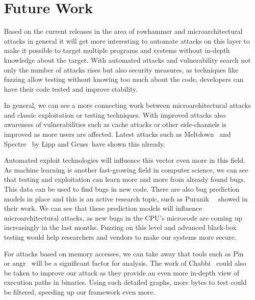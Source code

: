 \chapter{Future Work}\label{sec:futurework}

Based on the current releases in the area of rowhammer and microarchitectural
attacks in general it will get more interesting to automate attacks on this
layer to make it possible to target multiple programs and systems without
in-depth knowledge about the target. With automated attacks and vulnerability
search not only the number of attacks rises but also security measures, as
techniques like fuzzing allow testing without knowing too much about the code,
developers can have their code tested and improve stability.

In general, we can see a more connecting work between microarchitectural attacks
and classic exploitation or testing techniques. With improved attacks also
awareness of vulnerabilities such as cache attacks or other side-channels is
improved as more users are affected. Latest attacks such as
Meltdown~\cite{meltdown} and Spectre~\cite{spectre} by Lipp and Gruss~\etal have
shown this already.

Automated exploit technologies will influence this vector even more in this
field. As machine learning is another fast-growing field in computer science, we
can see that testing and exploitation can learn more and more from already found
bugs. This data can be used to find bugs in new code. There are also bug
prediction models in place and this is an active research topic, such as
Puranik~\etal~\cite{bugprediction} showed in their work. We can see that these
prediction models will influence microarchitectural attacks, as new bugs in the
CPU's microcode are coming up increasingly in the last months. Fuzzing on this
level and advanced black-box testing would help researchers and vendors to make
our systems more secure.

For attacks based on memory accesses, we can take away that tools such as
Pin~\cite{pintool} or angr~\cite{angrpaper} will be a significant factor for
analysis. The work of Chabbi~\etal\cite{pincallpaths} could also be taken to
improve our attack as they provide an even more in-depth view of execution paths
in binaries. Using such detailed graphs, more bytes to test could be filtered,
speeding up our framework even more.

